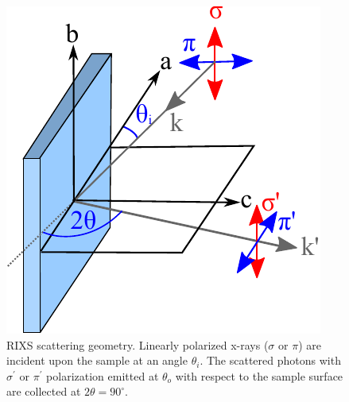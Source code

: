 \documentclass[aps,onecolumn, notitlepage, longbibliography]{revtex4-1}
\begin{document}
\begin{figure}
\includegraphics[width=1.7 in]{Figs/geometry.pdf}
\caption{RIXS scattering geometry. Linearly polarized x-rays ($\sigma$ or $\pi$) are incident upon the sample at an angle $\theta _i$. The scattered photons with $\sigma^\prime$ or $\pi^\prime$ polarization emitted at $\theta_o$ with respect to the sample surface are collected at $2\theta = 90^\circ$. \label{geometry}}
\end{figure}

\end{document}

